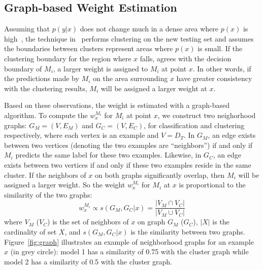 \subsection{Graph-based Weight Estimation}\label{sec:gwe}
Assuming that $p(y|x)$ does not change much in a dense area where $p(x)$ is high~\cite{cluster},
the technique in~\cite{lwe} performs clustering on the new testing set and assumes the boundaries between clusters represent areas where $p(x)$ is small.
If the clustering boundary for the region where $x$ falls, agrees with the decision boundary of $M_i$,
a larger weight is assigned to $M_i$ at point $x$.
In other words, if the predictions made by $M_i$ on the area surrounding $x$ have greater consistency with the clustering results, $M_i$ will be assigned
a larger weight at $x$.

Based on these observations, the weight is estimated with a graph-based algorithm.
To compute the $w_{x}^{M_i}$ for $M_i$ at point $x$, we construct two neighorhood graphs:
$G_M = (V, E_M)$ and $G_C = (V, E_C)$, for classification and clustering respectively,
where each vertex is an example and $V = D_T$. In $G_M$, an edge exists between two vertices (denoting the two examples are ``neighbors'') if and only if $M_i$ predicts the same label for these two examples. Likewise, in $G_C$, an edge exists between two vertices if and only if these two examples reside in the same cluster.
If the neighbors of $x$ on both graphs significantly overlap, then $M_i$ will be assigned a larger weight.
So the weight $w_{x}^{M_i}$ for $M_i$ at $x$ is proportional to the similarity of the two graphs:
\begin{equation}\label{eq_sim}
w_{x}^{M_i} \propto s(G_M, G_C|x) = \frac {|V_M \cap V_C|} {|V_M \cup V_C|}
\end{equation}
where $V_M$ ($V_C$) is the set of neighbors of $x$ on graph $G_M$ ($G_C$), $|X|$ is the cardinality of set $X$, and $s(G_M, G_C|x)$ is the similarity between two graphs.
Figure~\ref{fig:graph} illustrates an example of neighborhood graphs for an example $x$ (in grey circle): model 1 has a similarity of 0.75 with the cluster graph
 while model 2 has a similarity of 0.5 with the cluster graph.

